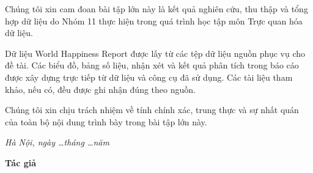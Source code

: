 
Chúng tôi xin cam đoan bài tập lớn này là kết quả nghiên cứu, thu thập và tổng hợp dữ liệu do Nhóm 11 thực hiện trong quá trình học tập môn Trực quan hóa dữ liệu.

Dữ liệu World Happiness Report được lấy từ các tệp dữ liệu nguồn phục vụ cho đề tài. Các biểu đồ, bảng số liệu, nhận xét và kết quả phân tích trong báo cáo được xây dựng trực tiếp từ dữ liệu và công cụ đã sử dụng. Các tài liệu tham khảo, nếu có, đều được ghi nhận đúng theo nguồn.

Chúng tôi xin chịu trách nhiệm về tính chính xác, trung thực và sự nhất quán của toàn bộ nội dung trình bày trong bài tập lớn này.

\vspace{1cm}

\begin{flushright}
\begin{minipage}{8cm}
\centering
\textit{Hà Nội, ngày \ldots tháng \ldots năm \Nam}

\vspace{0.5cm}

\textbf{Tác giả}

\vspace{2cm}

\textbf{\TenSinhVien}
\end{minipage}
\end{flushright}
